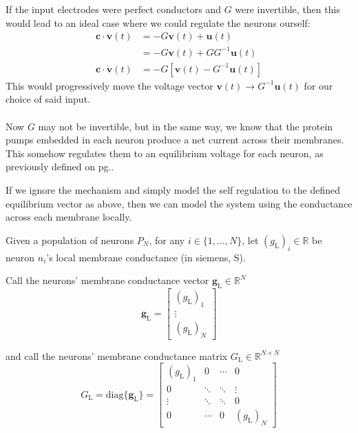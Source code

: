 \documentclass{article}
\begin{document}
If the input electrodes were perfect conductors and $G$ were invertible, then this would lead to an ideal case where we could regulate the neurons ourself:
\begin{align*}
\mathbf{c}\cdot\dot{\mathbf{v}}(t) &= -G\mathbf{v}(t) + \mathbf{u}(t) \\
&= -G\mathbf{v}(t) + GG^{-1}\mathbf{u}(t) \\
\mathbf{c}\cdot\dot{\mathbf{v}}(t) &= -G\left[ \mathbf{v}(t) - G^{-1}\mathbf{u}(t) \right]
\end{align*}
This would progressively move the voltage vector $\mathbf{v}(t) \to G^{-1}\mathbf{u}(t)$ for our choice of said input.

\paragraph{}
Now $G$ may not be invertible, but in the same way, we know that the protein pumps embedded in each neuron produce a net current across their membranes. This somehow regulates them to an equilibrium voltage for each neuron, as previously defined on pg.\pageref{e}.

If we ignore the mechanism and simply model the self regulation to the defined equilibrium vector as above, then we can model the system using the conductance across each membrane locally.

\begin{definition}[$G_{\text{L}} = \textbf{local membrane conductance matrix}$]\label{c}
Given a population of neurons $P_{N}$, for any $i \in \{ 1, \dots, N \}$, let $(g_{\text{L}})_{i}\in\mathbb{R}$ be neuron $n_{i}$'s local membrane conductance (in siemens, S).

Call the neurons' membrane conductance vector $\mathbf{g}_{\text{L}}\in\mathbb{R}^{N}$
\[ \mathbf{g}_{\text{L}} =
\begin{bmatrix}
(g_{\text{L}})_{1} \\
\vdots \\
(g_{\text{L}})_{N}
\end{bmatrix} \]

and call the neurons' membrane conductance matrix $G_{\text{L}}\in\mathbb{R}^{N\times N}$
\[ G_{\text{L}} = \text{diag}\{ \mathbf{g}_{\text{L}} \} =
\begin{bmatrix}
(g_{\text{L}})_{1} & 0 & \cdots & 0 \\
0 & \ddots & \ddots & \vdots \\
\vdots & \ddots & \ddots & 0 \\
0 & \cdots & 0 & (g_{\text{L}})_{N}
\end{bmatrix} \]
\end{definition}
\end{document}
